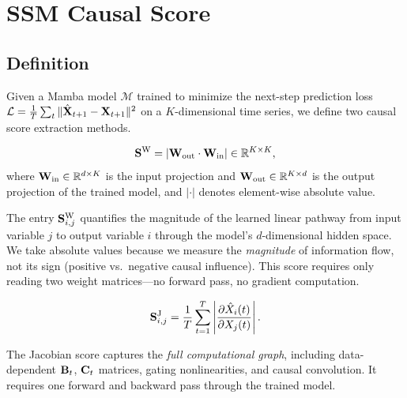 
\section{SSM Causal Score}
\label{sec:method}

\subsection{Definition}

Given a Mamba model $\mathcal{M}$ trained to minimize the next-step
prediction loss $\mathcal{L} = \frac{1}{T} \sum_t \|\hat{\mathbf{X}}_{t+1} -
\mathbf{X}_{t+1}\|^2$ on a $K$-dimensional time series, we define two causal
score extraction methods.

\begin{definition}
\label{def:weight_score}
\begin{equation}
    \mathbf{S}^{\text{W}} = |\mathbf{W}_{\text{out}} \cdot \mathbf{W}_{\text{in}}| \in \mathbb{R}^{K \times K},
\end{equation}
where $\mathbf{W}_{\text{in}} \in \mathbb{R}^{d \times K}$ is the input projection and
$\mathbf{W}_{\text{out}} \in \mathbb{R}^{K \times d}$ is the output projection of the
trained model, and $|\cdot|$ denotes element-wise absolute value.
\end{definition}

The entry $\mathbf{S}^{\text{W}}_{i,j}$ quantifies the magnitude of the learned
linear pathway from input variable $j$ to output variable $i$ through the
model's $d$-dimensional hidden space. We take absolute values because we
measure the \emph{magnitude} of information flow, not its sign (positive
vs.\ negative causal influence). This score requires only reading two
weight matrices---no forward pass, no gradient computation.

\begin{definition}
\label{def:jacobian_score}
\begin{equation}
    \mathbf{S}^{\text{J}}_{i,j} = \frac{1}{T} \sum_{t=1}^{T}
    \left| \frac{\partial \hat{X}_i(t)}{\partial X_j(t)} \right|.
    \label{eq:jacobian_score}
\end{equation}
\end{definition}

The Jacobian score captures the \emph{full computational graph}, including
data-dependent $\mathbf{B}_t$, $\mathbf{C}_t$ matrices, gating nonlinearities, and
causal convolution. It requires one forward and backward pass through the
trained model.

